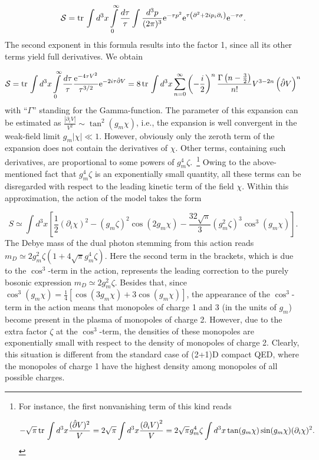 \documentclass[a4paper,12pt]{article}
\begin{document}
$${\cal S}={\rm tr}{\,}\int d^3x\int\limits_{0}^{\infty}\frac{d\tau}{\tau}\int\frac{d^3p}{(2\pi)^3}{\rm e}^{-\tau p^2}
{\rm e}^{\tau\left(\partial^2+2ip_i\partial_i\right)}{\rm e}^{-\tau\sigma}.$$
The second exponent in this formula results into the factor 1, since all its other terms yield full derivatives. We obtain

$${\cal S}={\rm tr}{\,}\int d^3x\int\limits_{0}^{\infty}\frac{d\tau}{\tau}\frac{{\rm e}^{-4\tau V^2}}{\tau^{3/2}}
{\rm e}^{-2i\tau\hat\partial V}=8{\,}{\rm tr}{\,}\int d^3x\sum\limits_{n=0}^{\infty}\left(-\frac{i}{2}\right)^n
\frac{\Gamma\left(n-\frac32\right)}{n!}V^{3-2n}\left(\hat\partial V\right)^n$$
with ``$\Gamma$'' standing for the Gamma-function. The parameter of this expansion can be estimated as
$\frac{\left|\partial_iV\right|}{V^2}\sim\tan^2\left(g_m\chi\right)$, i.e., the expansion is well convergent in the
weak-field limit $g_m|\chi|\ll 1$. However, obviously only the zeroth term of the expansion does not contain the
derivatives of $\chi$. Other terms, containing
such derivatives, are proportional to some powers of $g_m^4\zeta$.~\footnote{For instance,
the first nonvanishing term of this kind reads

$$-\sqrt{\pi}{\,}{\rm tr}{\,}\int d^3x\frac{(\hat\partial V)^2}{V}=
2\sqrt{\pi}\int d^3x\frac{\left(\partial_i V\right)^2}{V}=
2\sqrt{\pi}g_m^4\zeta\int d^3x\tan(g_m\chi)\sin(g_m\chi)(\partial_i\chi)^2.$$} Owing to the above-mentioned fact that $g_m^4\zeta$
is an exponentially small quantity, all these terms can be disregarded with respect to the leading kinetic term of the
field $\chi$. Within this approximation, the action of the model takes the form

\begin{equation}
\label{2}
S\simeq\int d^3x\left[\frac12(\partial_i\chi)^2-(g_m\zeta)^2\cos(2g_m\chi)-\frac{32\sqrt{\pi}}{3}(g_m^2\zeta)^3\cos^3(g_m\chi)\right].
\end{equation}
The Debye mass of the dual photon stemming from this action reads $m_D\simeq2g_m^2\zeta\left(1+4\sqrt{\pi}g_m^4\zeta\right)$. Here
the second term in the brackets, which is due to the $\cos^3$-term in the action, represents the
leading correction to the purely bosonic expression $m_D\simeq2g_m^2\zeta$. Besides that, since $\cos^3(g_m\chi)=\frac14\left[\cos(3g_m\chi)+
3\cos(g_m\chi)\right]$, the appearance of the $\cos^3$-term in the action means that monopoles of charge 1 and 3 (in the units of $g_m$)
become present in the plasma of monopoles of charge 2.
However, due to the extra factor $\zeta$ at the $\cos^3$-term,
the densities of these monopoles are exponentially small with respect to the
density of monopoles of charge 2. Clearly, this situation is different from the
standard case of (2+1)D compact QED,
where the monopoles of charge 1 have the highest density among monopoles of all possible charges.
\end{document}
